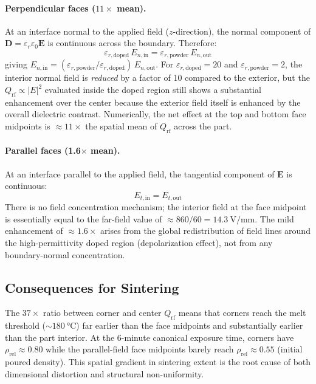 \documentclass[5p,times]{elsarticle}
\newcommand{\Qrf}{Q_{\mathrm{rf}}}
\newcommand{\rhorel}{\rho_{\mathrm{rel}}}
\newcommand{\vect}[1]{\boldsymbol{#1}}
\begin{document}
\paragraph{Perpendicular faces ($11\times$ mean).}
At an interface normal to the applied field ($z$-direction), the normal
component of $\vect{D} = \varepsilon_r\varepsilon_0\vect{E}$ is
continuous across the boundary.  Therefore:
\begin{equation}
  \varepsilon_{r,\mathrm{doped}}\,E_{n,\mathrm{in}} =
  \varepsilon_{r,\mathrm{powder}}\,E_{n,\mathrm{out}}
  \label{eq:normal_D_continuity}
\end{equation}
giving $E_{n,\mathrm{in}} = (\varepsilon_{r,\mathrm{powder}} /
\varepsilon_{r,\mathrm{doped}})\,E_{n,\mathrm{out}}$.  For
$\varepsilon_{r,\mathrm{doped}} = 20$ and $\varepsilon_{r,\mathrm{powder}} = 2$,
the interior normal field is \emph{reduced} by a factor of 10 compared
to the exterior, but the $\Qrf \propto |E|^{2}$ evaluated inside the
doped region still shows a substantial enhancement over the center
because the exterior field itself is enhanced by the overall
dielectric contrast.  Numerically, the net effect at the top and
bottom face midpoints is $\approx 11\times$ the spatial mean of
$\Qrf$ across the part.

\paragraph{Parallel faces (1.6$\times$ mean).}
At an interface parallel to the applied field, the tangential component
of $\vect{E}$ is continuous:
\begin{equation}
  E_{t,\mathrm{in}} = E_{t,\mathrm{out}}
  \label{eq:tangential_E_continuity}
\end{equation}
There is no field concentration mechanism; the interior field at the
face midpoint is essentially equal to the far-field value of
$\approx 860/60 = \SI{14.3}{\volt\per\milli\meter}$.  The mild
enhancement of $\approx 1.6\times$ arises from the global redistribution
of field lines around the high-permittivity doped region
(depolarization effect), not from any boundary-normal concentration.

\subsection{Consequences for Sintering}

The $37\times$ ratio between corner and center $\Qrf$ means that
corners reach the melt threshold ($\sim\SI{180}{\celsius}$) far earlier
than the face midpoints and substantially earlier than the part
interior.  At the 6-minute canonical exposure time, corners have
$\rhorel \approx 0.80$ while the parallel-field face midpoints barely
reach $\rhorel \approx 0.55$ (initial poured density).  This spatial
gradient in sintering extent is the root cause of both dimensional
distortion and structural non-uniformity.
\end{document}
